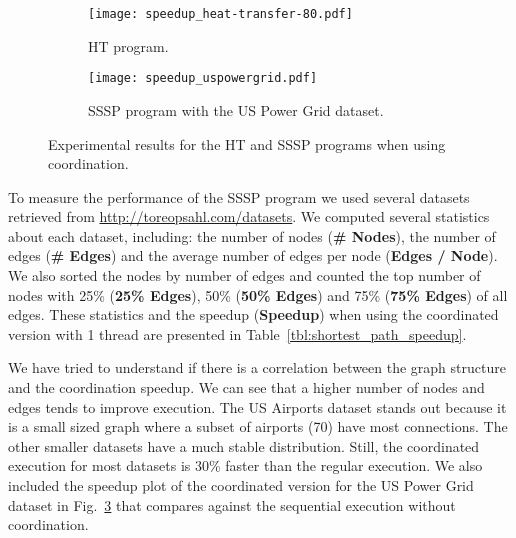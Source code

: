 \begin{figure}[h!]
     \centering
   \begin{subfigure}[b]{0.4\textwidth}
      \texttt{[image: speedup\_heat-transfer-80.pdf]}
      \caption{HT program.\newline}\label{exp:heat-transfer}
   \end{subfigure}
   \begin{subfigure}[b]{0.4\textwidth}
      \texttt{[image: speedup\_uspowergrid.pdf]}
      \caption{SSSP program with the US Power Grid dataset.}\label{exp:sssp-uspowergrid}
   \end{subfigure}
   \caption{Experimental results for the HT and SSSP programs when using coordination.}
\end{figure}

To measure the performance of the SSSP program we used several datasets retrieved from \url{http://toreopsahl.com/datasets}. We computed several
statistics about each dataset, including: the number of nodes (\textbf{\# Nodes}), the number of edges (\textbf{\# Edges}) and
the average number of edges per node (\textbf{Edges / Node}). We also sorted the nodes by number of edges and counted the top number of nodes
with 25\% (\textbf{25\% Edges}), 50\% (\textbf{50\% Edges}) and 75\% (\textbf{75\% Edges}) of all edges.
These statistics and the speedup (\textbf{Speedup}) when using the coordinated version with 1 thread are presented in Table~\ref{tbl:shortest_path_speedup}.

We have tried to understand if there is a correlation between the graph structure and the coordination speedup. We can see that a higher number
of nodes and edges tends to improve execution. The US Airports dataset stands out because it is a small sized graph where a subset of airports
(70) have most connections. The other smaller datasets have a much stable distribution.
Still, the coordinated execution for most datasets is 30\% faster than the regular execution. We also included the speedup plot of the coordinated version
for the US Power Grid dataset in Fig.~\ref{exp:sssp-uspowergrid} that compares against the sequential execution without coordination.

